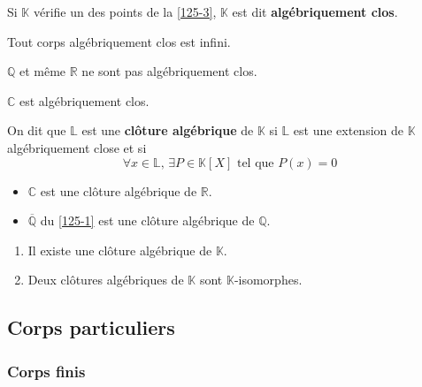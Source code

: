 	\begin{definition}
		Si $\mathbb{K}$ vérifie un des points de la \cref{125-3}, $\mathbb{K}$ est dit \textbf{algébriquement clos}.
	\end{definition}

	\begin{proposition}
		Tout corps algébriquement clos est infini.
	\end{proposition}

	\begin{cexample}
		$\mathbb{Q}$ et même $\mathbb{R}$ ne sont pas algébriquement clos.
	\end{cexample}

	\begin{theorem}
		$\mathbb{C}$ est algébriquement clos.
	\end{theorem}

	\begin{definition}
		On dit que $\mathbb{L}$ est une \textbf{clôture algébrique} de $\mathbb{K}$ si $\mathbb{L}$ est une extension de $\mathbb{K}$ algébriquement close et si
		\[ \forall x \in \mathbb{L}, \, \exists P \in \mathbb{K}[X] \text{ tel que } P(x) = 0 \]
	\end{definition}

	\begin{example}
		\begin{itemize}
			\item $\mathbb{C}$ est une clôture algébrique de $\mathbb{R}$.
			\item $\overline{\mathbb{Q}}$ du \cref{125-1} est une clôture algébrique de $\mathbb{Q}$.
		\end{itemize}
	\end{example}

	\begin{theorem}[Steinitz]
		\begin{enumerate}[label=(\roman*)]
			\item Il existe une clôture algébrique de $\mathbb{K}$.
			\item Deux clôtures algébriques de $\mathbb{K}$ sont $\mathbb{K}$-isomorphes.
		\end{enumerate}
	\end{theorem}

	\subsection{Corps particuliers}

	\subsubsection{Corps finis}

